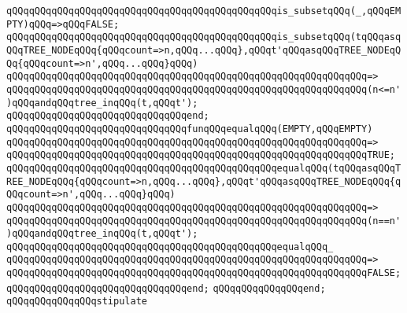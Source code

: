 \verb|qQQqqQQqqQQqqQQqqQQqqQQqqQQqqQQqqQQqqQQqqQQqqQQqis_subsetqQQq(_,qQQqEMPTY)qQQq=>qQQqFALSE;|\newline
\newline
\verb|qQQqqQQqqQQqqQQqqQQqqQQqqQQqqQQqqQQqqQQqqQQqqQQqis_subsetqQQq(tqQQqasqQQqTREE_NODEqQQq{qQQqcount=>n,qQQq...qQQq},qQQqt'qQQqasqQQqTREE_NODEqQQq{qQQqcount=>n',qQQq...qQQq}qQQq)|\newline
\verb|qQQqqQQqqQQqqQQqqQQqqQQqqQQqqQQqqQQqqQQqqQQqqQQqqQQqqQQqqQQqqQQq=>|\newline
\verb|qQQqqQQqqQQqqQQqqQQqqQQqqQQqqQQqqQQqqQQqqQQqqQQqqQQqqQQqqQQqqQQq(n<=n')qQQqandqQQqtree_inqQQq(t,qQQqt');|\newline
\verb|qQQqqQQqqQQqqQQqqQQqqQQqqQQqqQQqend;|\newline
\newline
\newline
\verb|qQQqqQQqqQQqqQQqqQQqqQQqqQQqqQQqfunqQQqequalqQQq(EMPTY,qQQqEMPTY)|\newline
\verb|qQQqqQQqqQQqqQQqqQQqqQQqqQQqqQQqqQQqqQQqqQQqqQQqqQQqqQQqqQQqqQQq=>|\newline
\verb|qQQqqQQqqQQqqQQqqQQqqQQqqQQqqQQqqQQqqQQqqQQqqQQqqQQqqQQqqQQqqQQqTRUE;|\newline
\newline
\verb|qQQqqQQqqQQqqQQqqQQqqQQqqQQqqQQqqQQqqQQqqQQqqQQqequalqQQq(tqQQqasqQQqTREE_NODEqQQq{qQQqcount=>n,qQQq...qQQq},qQQqt'qQQqasqQQqTREE_NODEqQQq{qQQqcount=>n',qQQq...qQQq}qQQq)|\newline
\verb|qQQqqQQqqQQqqQQqqQQqqQQqqQQqqQQqqQQqqQQqqQQqqQQqqQQqqQQqqQQqqQQq=>|\newline
\verb|qQQqqQQqqQQqqQQqqQQqqQQqqQQqqQQqqQQqqQQqqQQqqQQqqQQqqQQqqQQqqQQq(n==n')qQQqandqQQqtree_inqQQq(t,qQQqt');|\newline
\newline
\verb|qQQqqQQqqQQqqQQqqQQqqQQqqQQqqQQqqQQqqQQqqQQqqQQqequalqQQq_|\newline
\verb|qQQqqQQqqQQqqQQqqQQqqQQqqQQqqQQqqQQqqQQqqQQqqQQqqQQqqQQqqQQqqQQq=>|\newline
\verb|qQQqqQQqqQQqqQQqqQQqqQQqqQQqqQQqqQQqqQQqqQQqqQQqqQQqqQQqqQQqqQQqFALSE;|\newline
\verb|qQQqqQQqqQQqqQQqqQQqqQQqqQQqqQQqend;|\newline
\verb|qQQqqQQqqQQqqQQqend;|\newline
\newline
\newline
\newline
\verb|qQQqqQQqqQQqqQQqstipulate|\newline
